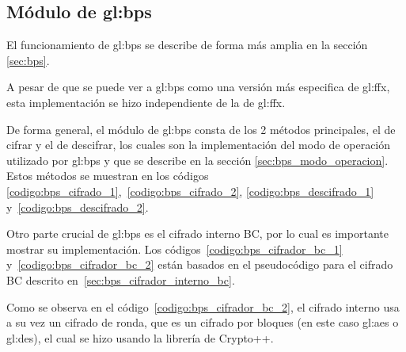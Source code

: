 %
%
%

%
\subsection{Módulo de \texorpdfstring{\acrshort{gl:bps}}{BPS}}

El funcionamiento de \gls{gl:bps} se describe de forma más amplia en la sección
\ref{sec:bps}.


A pesar de que se puede ver a \gls{gl:bps} como una versión más especifica de
\gls{gl:ffx}, esta implementación se hizo independiente de la de \gls{gl:ffx}.

De forma general, el módulo de \gls{gl:bps} consta de los 2 métodos principales,
el de cifrar y el de descifrar, los cuales son la implementación del modo de
operación utilizado por \gls{gl:bps} y que se describe en la sección
\ref{sec:bps_modo_operacion}. Estos métodos se muestran en los códigos
\ref{codigo:bps_cifrado_1},~\ref{codigo:bps_cifrado_2},
\ref{codigo:bps_descifrado_1} y~\ref{codigo:bps_descifrado_2}.





Otro parte crucial de \gls{gl:bps} es el cifrado interno BC, por lo cual es
importante mostrar su implementación. Los códigos~\ref{codigo:bps_cifrador_bc_1}
y~\ref{codigo:bps_cifrador_bc_2} están basados en el pseudocódigo para el
cifrado BC descrito en~\ref{sec:bps_cifrador_interno_bc}.



Como se observa en el código~\ref{codigo:bps_cifrador_bc_2}, el cifrado
interno usa a su vez un cifrado de ronda, que es un cifrado por bloques
(en este caso \gls{gl:aes} o \gls{gl:des}), el cual se hizo usando la
librería de Crypto++.
